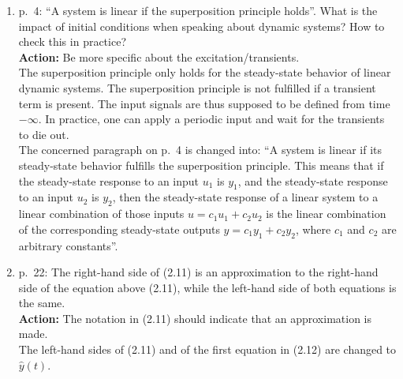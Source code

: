\documentclass{article}
\newenvironment{answer}{\noindent\ignorespaces\color{blue}}{\noindent\ignorespacesafterend}
\newcommand{\ans}[1]{\begin{answer}#1\end{answer}}
\newcommand{\action}[1]{\textbf{Action:} #1}
\newcommand{\oldnewpage}[2]{\marginpar{{\color{black}#1} / {\color{red}#2}}}
\begin{document}
\begin{enumerate}
	\item p.~4: ``A system is linear if the superposition principle holds''. What is the impact of initial conditions when speaking about dynamic systems? How to check this in practice?\\
		\action{Be more specific about the excitation/transients.}\\
		\ans{The superposition principle only holds for the steady-state behavior of linear dynamic systems. The superposition principle is not fulfilled if a transient term is present. The input signals are thus supposed to be defined from time $-\infty$. In practice, one can apply a periodic input and wait for the transients to die out.\\
			\oldnewpage{4}{4}The concerned paragraph on p.~4 is changed into: ``A system is linear if its steady-state behavior fulfills the superposition principle. This means that if the steady-state response to an input $u_1$ is $y_1$, and the steady-state response to an input $u_2$ is $y_2$, then the steady-state response of a linear system to a linear combination of those inputs \mbox{$u=c_1 u_1 + c_2 u_2$} is the linear combination of the corresponding steady-state outputs \mbox{$y=c_1 y_1 +c_2 y_2$}, where $c_1$ and $c_2$ are arbitrary constants''.}

	\item p.~22: The right-hand side of (2.11) is an approximation to the right-hand side of the equation above (2.11), while the left-hand side of both equations is the same.\\
		\action{The notation in (2.11) should indicate that an approximation is made.}\\
		\ans{\oldnewpage{22}{24}The left-hand sides of (2.11) and of the first equation in (2.12) are changed to $\hat{y}(t)$.
			}


\end{enumerate}
\end{document}
